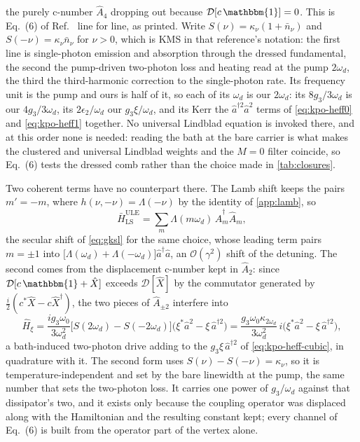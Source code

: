 \documentclass[a4paper,11pt]{article}
\newcommand{\id}{\mathbbm{1}}
\newcommand{\Dcal}{\mathcal{D}}
\begin{document}
\begin{example}
the purely c-number $\hat A_4$ dropping out because $\Dcal[c\,\id] = 0$. This is Eq.~(6) of Ref.~\cite{Venkatraman2024Nonlinear} line for line, as printed. Write $S(\nu) = \kappa_\nu(1+\bar n_\nu)$ and $S(-\nu) = \kappa_\nu\bar n_\nu$ for $\nu>0$, which is KMS in that reference's notation: the first line is single-photon emission and absorption through the dressed fundamental, the second the pump-driven two-photon loss and heating read at the pump $2\omega_d$, the third the third-harmonic correction to the single-photon rate. Its frequency unit is the pump and ours is half of it, so each of its $\omega_d$ is our $2\omega_d$: its $8g_3/3\omega_d$ is our $4g_3/3\omega_d$, its $2\epsilon_2/\omega_d$ our $g_3\xi/\omega_d$, and its Kerr the $\hat a^{\dagger2}\hat a^2$ terms of \eqref{eq:kpo-heff0} and \eqref{eq:kpo-heff1} together. No universal Lindblad equation is invoked there, and at this order none is needed: reading the bath at the bare carrier is what makes the clustered and universal Lindblad weights and the $M=0$ filter coincide, so Eq.~(6) tests the dressed comb rather than the choice made in \cref{tab:closures}.

Two coherent terms have no counterpart there. The Lamb shift keeps the pairs $m'=-m$, where $h(\nu,-\nu) = \Lambda(-\nu)$ by the identity of \cref{app:lamb}, so
\begin{equation}\label{eq:kpo-lamb-averaged}
  \bar H^{\mathrm{ULE}}_{\mathrm{LS}} = \sum_m \Lambda(m\omega_d)\,\hat A_m^\dagger\hat A_m ,
\end{equation}
the secular shift of \eqref{eq:gksl} for the same choice, whose leading term pairs $m=\pm1$ into $\big[\Lambda(\omega_d)+\Lambda(-\omega_d)\big]\hat a^\dagger\hat a$, an $\mathcal O(\gamma^2)$ shift of the detuning. The second comes from the displacement c-number kept in $\hat A_2$: since $\Dcal[c\,\id + \hat X]$ exceeds $\Dcal[\hat X]$ by the commutator generated by $\tfrac{i}{2}(c^*\hat X - c\hat X^\dagger)$, the two pieces of $\hat A_{\pm2}$ interfere into
\begin{equation}\label{eq:kpo-Hxi}
  \hat H_\xi = \frac{ig_3\omega_0}{3\omega_d^2}\big[S(2\omega_d) - S(-2\omega_d)\big]
  \big(\xi^*\hat a^2 - \xi\,\hat a^{\dagger2}\big)
  = \frac{g_3\omega_0\kappa_{2\omega_d}}{3\omega_d^2}\,i\big(\xi^*\hat a^2 - \xi\,\hat a^{\dagger2}\big),
\end{equation}
a bath-induced two-photon drive adding to the $g_3\xi\,\hat a^{\dagger2}$ of \eqref{eq:kpo-heff-cubic}, in quadrature with it. The second form uses $S(\nu)-S(-\nu) = \kappa_\nu$, so it is temperature-independent and set by the bare linewidth at the pump, the same number that sets the two-photon loss. It carries one power of $g_3/\omega_d$ against that dissipator's two, and it exists only because the coupling operator was displaced along with the Hamiltonian and the resulting constant kept; every channel of Eq.~(6) is built from the operator part of the vertex alone.

\end{example}
\end{document}
